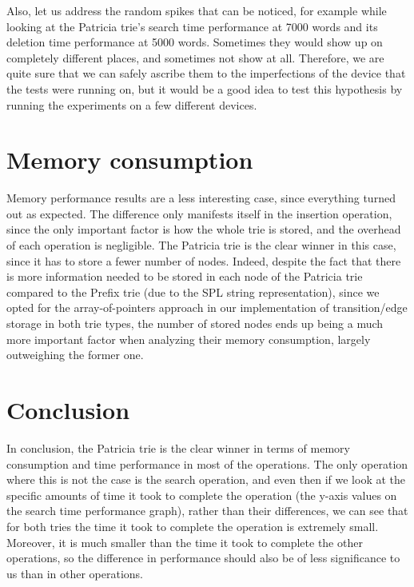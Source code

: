 \documentclass[essay]{fer}
\begin{document}
Also, let us address the random spikes that can be noticed, for example while looking at the Patricia trie's search time performance at 7000 words and its deletion time performance at 5000 words. Sometimes they would show up on completely different places, and sometimes not show at all. Therefore, we are quite sure that we can safely ascribe them to the imperfections of the device that the tests were running on, but it would be a good idea to test this hypothesis by running the experiments on a few different devices.


\section{Memory consumption}
\label{sec:memory_consumption_discussion}

Memory performance results are a less interesting case, since everything turned out as expected.
The difference only manifests itself in the insertion operation,
since the only important factor is how the whole trie is stored, and the overhead of each operation is negligible.
The Patricia trie is the clear winner in this case, since it has to store a fewer number of nodes.
Indeed, despite the fact that there is more information needed to be stored in each node of the Patricia trie compared to the Prefix trie (due to the SPL string representation),
since we opted for the array-of-pointers approach in our implementation of transition/edge storage in both trie types,
the number of stored nodes ends up being a much more important factor when analyzing their memory consumption, largely outweighing the former one.


\section{Conclusion}
\label{sec:conclusion}

In conclusion, the Patricia trie is the clear winner in terms of memory consumption and time performance in most of the operations.
The only operation where this is not the case is the search operation, and even then
if we look at the specific amounts of time it took to complete the operation (the y-axis values on the search time performance graph),
rather than their differences, we can see that for both tries the time it took to complete the operation is extremely small.
Moreover, it is much smaller than the time it took to complete the other operations, so the difference in performance should also be of less significance to us than in other operations.
\end{document}
